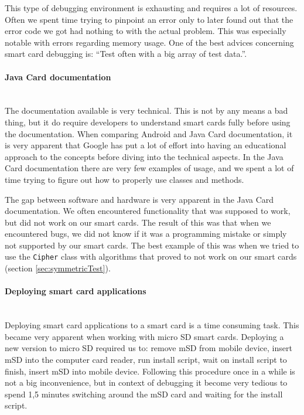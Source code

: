 This type of debugging environment is exhausting and requires a lot of resources. Often we spent time trying to pinpoint an error only to later found out that the error code we got had nothing to with the actual problem. This was especially notable with errors regarding memory usage. One of the best advices concerning smart card debugging is: ``Test often with a big array of test data.''.

\paragraph{Java Card documentation}\mbox{}\\
The documentation available is very technical. This is not by any means a bad thing, but it do require developers to understand smart cards fully before using the documentation. When comparing Android and Java Card documentation, it is very apparent that Google has put a lot of effort into having an educational approach to the concepts before diving into the technical aspects. In the Java Card documentation there are very few examples of usage, and we spent a lot of time trying to figure out how to properly use classes and methods.

The gap between software and hardware is very apparent in the Java Card documentation. We often encountered functionality that was supposed to work, but did not work on our smart cards. The result of this was that when we encountered bugs, we did not know if it was a programming mistake or simply not supported by our smart cards. The best example of this was when we tried to use the \texttt{Cipher} class with algorithms that proved to not work on our smart cards (section \ref{sec:symmetricTest}).

\paragraph{Deploying smart card applications}\mbox{}\\
Deploying smart card applications to a smart card is a time consuming task. This became very apparent when working with micro SD smart cards. Deploying a new version to micro SD required us to: remove mSD from mobile device, insert mSD into the computer card reader, run install script, wait on install script to finish, insert mSD into mobile device. Following this procedure once in a while is not a big inconvenience, but in context of debugging it become very tedious to spend 1,5 minutes switching around the mSD card and waiting for the install script.

